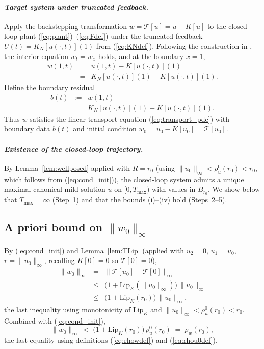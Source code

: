\documentclass[amsthm]{autart}
\theoremstyle{plain}
\theoremstyle{definition}
\newcommand{\Tcal}{\mathcal{T}}
\newcommand{\Lipk}{\mathrm{Lip}_K}
\begin{document}
\paragraph*{\normalfont\em Target system under truncated feedback.}
Apply the backstepping transformation $w = \Tcal[u] = u - K[u]$ to the closed-loop plant (\ref{eq:plant})--(\ref{eq:Fdef}) under the truncated feedback $U(t) = K_N[u(\cdot,t)](1)$ from (\ref{eq:KNdef}). Following the construction in \cite{krstic2026feedbacklinearizationhyperbolicpdes}, the interior equation $w_t = w_x$ holds, and at the boundary $x = 1$,
\begin{eqnarray}
w(1,t) &=& u(1,t) - K[u(\cdot,t)](1) \nonumber \\
&=& K_N[u(\cdot,t)](1) - K[u(\cdot,t)](1).
\label{eq:wbdy}
\end{eqnarray}
Define the boundary residual
\begin{eqnarray}
b(t) &:=& w(1,t) \nonumber \\
&=& K_N[u(\cdot,t)](1) - K[u(\cdot,t)](1).
\label{eq:bdef}
\end{eqnarray}
Thus $w$ satisfies the linear transport equation (\ref{eq:transport_pde}) with boundary data $b(t)$ and initial condition $w_0 = u_0 - K[u_0] = \Tcal[u_0]$.

\paragraph*{\normalfont\em Existence of the closed-loop trajectory.}
By Lemma~\ref{lem:wellposed} applied with $R = r_0$ (using $\|u_0\|_\infty < \rho_u^0(r_0) < r_0$, which follows from (\ref{eq:cond_init})), the closed-loop system admits a unique maximal canonical mild solution $u$ on $[0, T_{\max})$ with values in $\overline B_{r_0}$. We show below that $T_{\max} = \infty$ (Step~1) and that the bounds (i)--(iv) hold (Steps~2--5).

\subsection*{A priori bound on $\|w_0\|_\infty$}

By (\ref{eq:cond_init}) and Lemma~\ref{lem:TLip} (applied with $u_2 = 0$, $u_1 = u_0$, $r = \|u_0\|_\infty$, recalling $K[0] = 0$ so $\Tcal[0] = 0$),
\begin{eqnarray}
\|w_0\|_\infty &=& \|\Tcal[u_0] - \Tcal[0]\|_\infty \nonumber \\
&\le& \bigl(1 + \Lipk(\|u_0\|_\infty)\bigr)\,\|u_0\|_\infty \nonumber \\
&\le& \bigl(1 + \Lipk(r_0)\bigr)\,\|u_0\|_\infty,
\label{eq:w0_bound}
\end{eqnarray}
the last inequality using monotonicity of $\Lipk$ and $\|u_0\|_\infty < \rho_u^0(r_0) < r_0$. Combined with (\ref{eq:cond_init}),
\begin{equation}
\|w_0\|_\infty \;<\; \bigl(1 + \Lipk(r_0)\bigr)\,\rho_u^0(r_0) \;=\; \rho_w(r_0),
\label{eq:w0_in_ball}
\end{equation}
the last equality using definitions (\ref{eq:rhowdef}) and (\ref{eq:rhou0def}).
\end{document}
